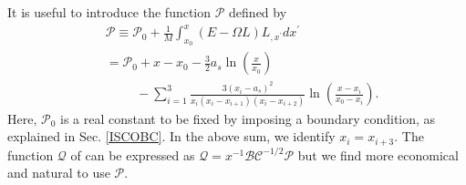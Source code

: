 \documentclass[a4paper,fleqn,usenatbib]{mnrasMOD}
\numberwithin{equation}{section}
\begin{document}
It is useful to introduce the function $\mathcal{P}$ defined by
\begin{align} \label{P}
&\mathcal{P}  \equiv \mathcal{P}_0+ \frac{1}{M} \int_{x_0}^{x} (E- \Omega L) L_{,x^{\prime}} dx^{\prime} \nonumber\\
&= \mathcal{P}_0+ x - x_0 - \frac{3}{2} a_s \ln\left(\frac{x}{x_0}\right)\nonumber\\
&\hspace{1cm} - \sum_{i=1}^{3}\frac{3(x_i-a_s)^2}{x_i(x_i-x_{i+1})(x_i-x_{i+2})}\ln \left(\frac{x-x_i}{x_0-x_i} \right).
\end{align}
Here, $\mathcal{P}_0$  is a real constant to be fixed by imposing a boundary condition, as explained in Sec. \ref{ISCOBC}.
In the above sum, we identify $x_i = x_{i+3}$. The function $\mathcal Q$ of \cite{25341} can be expressed as $\mathcal Q = x^{-1}\mathcal B \mathcal C^{-1/2}\mathcal P$ but we find more economical and natural to use $\mathcal P$. 
\end{document}
